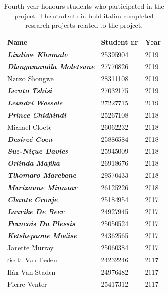 \documentclass{wrcreport}
\begin{document}
\begin{table}[!htbp]
\caption{Fourth year honours students who participated in the project. The students in bold italics completed research projects related to the project.}
\label{table:honoursstudents}
\begin{center}
\begin{tabular}{ l l l } 
\toprule
\bfseries Name & \bfseries Student nr & \bfseries Year \\
\midrule
\bfseries\itshape Lindiwe      Khumalo   &    25395904 & 2019 \\
\bfseries\itshape Dlangamandla Moletsane &    27770826 & 2019 \\
Nzuzo        Shongwe   &    28311108 & 2019 \\
\bfseries\itshape Lerato       Tshisi    &    27032175 & 2019 \\
\bfseries\itshape Leandri      Wessels   &    27227715 & 2019 \\
\midrule
\bfseries\itshape Prince    Chidhindi &   25267108 & 2018 \\
Michael   Cloete    &   26062232 & 2018 \\
\bfseries\itshape Desire\'e   Coen      &   25886584 & 2018 \\
\bfseries\itshape Sue-Nique Davies    &   25945009 & 2018 \\
\bfseries\itshape Orlinda   Mafika    &   26918676 & 2018 \\
\bfseries\itshape Tlhomaro  Marebane  &   29570433 & 2018 \\
\bfseries\itshape Marizanne Minnaar   &   26125226 & 2018 \\
\midrule
\bfseries\itshape Chante      Cronje     & 25184954 & 2017 \\
\bfseries\itshape Laurike     De Beer    & 24927945 & 2017 \\
\bfseries\itshape Francois    Du Plessis & 25050524 & 2017 \\
\bfseries\itshape Ketshepaone Modise     & 24362565 & 2017 \\
Janette     Murray     & 25060384 & 2017 \\
Scott       Van Eeden  & 24232246 & 2017 \\
Il\'an        Van Staden & 24976482 & 2017 \\
Pierre      Venter     & 25417312 & 2017 \\
\bottomrule 
\end{tabular}
\end{center}
\end{table}
\end{document}

